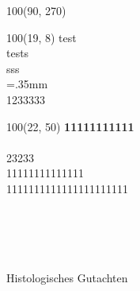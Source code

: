 \documentclass{scrartcl}
\begin{document}
 
 
\baselineskip10pt

\textblockorigin{0in}{0in}
\setlength{\TPHorizModule}{1mm}
\setlength{\TPVertModule}{1mm}

{
\begin{textblock}{100}(90, 270) 
%
\end{textblock}
}

{
\scriptsize
\begin{textblock}{100}(19, 8) 
\noindent test\\
tests\\
sss\\
\X=.35mm        
\barheight=1cm 
\\
1233333\\
\end{textblock}
}


{
\begin{textblock}{100}(22, 50) 
\noindent 
\textbf{11111111111} \\\\
23233\\
11111111111111\\
1111111111111111111111\\
\end{textblock}
}

~\\
\vspace{5.0cm}\\
\noindent\makebox[\linewidth]{\rule{\linewidth}{0.4pt}}\\\\
{\huge Histologisches Gutachten} \\
\end{document}
